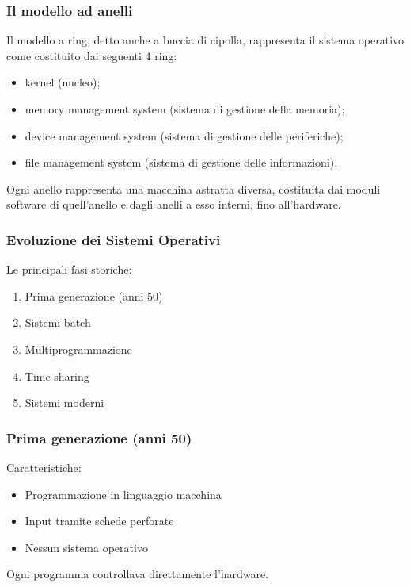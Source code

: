 \documentclass{beamer}
\begin{document}
	\begin{frame}
		\frametitle{Il modello ad anelli}
		
		Il modello a ring, detto anche a buccia di cipolla, rappresenta
		il sistema operativo come costituito dai seguenti 4 ring:
		
		\begin{itemize}
			\item kernel (nucleo);
			\item memory management system (sistema di gestione della memoria);
			\item device management system (sistema di gestione delle periferiche);
			\item file management system (sistema di gestione delle informazioni).
		\end{itemize}
		
		Ogni anello rappresenta una macchina astratta diversa, costituita
		dai moduli software di quell'anello e dagli anelli a esso interni,
		fino all'hardware.
		
	\end{frame}
	
	
	\begin{frame}
		\frametitle{Evoluzione dei Sistemi Operativi}
		
		Le principali fasi storiche:
		
		\begin{enumerate}
			\item Prima generazione (anni 50)
			\item Sistemi batch
			\item Multiprogrammazione
			\item Time sharing
			\item Sistemi moderni
		\end{enumerate}
		
	\end{frame}
	
	
	\begin{frame}
		\frametitle{Prima generazione (anni 50)}
		
		Caratteristiche:
		
		\begin{itemize}
			\item Programmazione in linguaggio macchina
			\item Input tramite schede perforate
			\item Nessun sistema operativo
		\end{itemize}
		
		Ogni programma controllava direttamente l'hardware.
		
	\end{frame}
	
\end{document}
